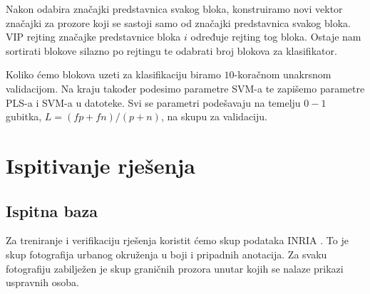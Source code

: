 \documentclass[seminar]{fer}
\begin{document}
Nakon odabira značajki predstavnica svakog bloka, konstruiramo novi vektor značajki za prozore koji se sastoji samo od značajki predstavnica svakog bloka. VIP rejting značajke predstavnice bloka $i$ određuje rejting tog bloka. Ostaje nam sortirati blokove silazno po rejtingu te odabrati broj blokova za klasifikator. 

Koliko ćemo blokova uzeti za  klasifikaciju biramo $10$-koračnom unakrsnom validacijom.
Na kraju također podesimo parametre SVM-a te zapišemo parametre PLS-a i SVM-a u datoteke. Svi se parametri podešavaju na temelju $0-1$ gubitka, $L = (fp + fn) / (p + n)$, na skupu za validaciju.

\chapter{Ispitivanje rješenja}
\section{Ispitna baza}

Za treniranje i verifikaciju rješenja koristit ćemo skup podataka INRIA \cite{DT05}. To je skup fotografija urbanog okruženja u boji i pripadnih anotacija. Za svaku fotografiju zabilježen je skup graničnih prozora  unutar kojih se nalaze prikazi uspravnih osoba.
\end{document}
